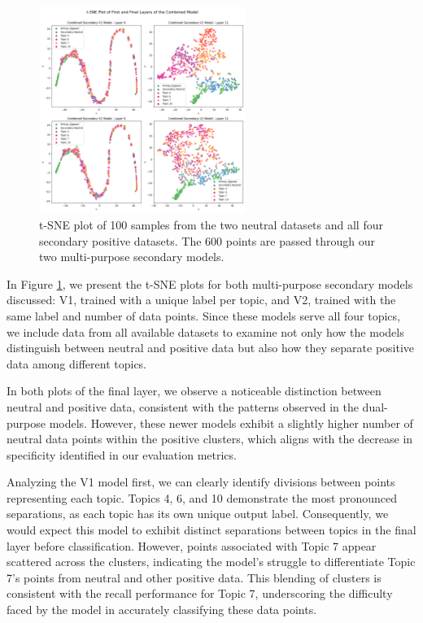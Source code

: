 \begin{figure}[ht]
    \centering
    \includegraphics[width=0.6\textwidth]{graphs/tsne/combined.png}
    \caption{t-SNE plot of 100 samples from the two neutral datasets and all four secondary positive datasets. The 600 points are passed through our two multi-purpose secondary models.}
    \label{fig:t_sne_plot_comb}
\end{figure}

In Figure \ref{fig:t_sne_plot_comb}, we present the t-SNE plots for both multi-purpose secondary models discussed: V1, trained with a unique label per topic, and V2, trained with the same label and number of data points. Since these models serve all four topics, we include data from all available datasets to examine not only how the models distinguish between neutral and positive data but also how they separate positive data among different topics.

In both plots of the final layer, we observe a noticeable distinction between neutral and positive data, consistent with the patterns observed in the dual-purpose models. However, these newer models exhibit a slightly higher number of neutral data points within the positive clusters, which aligns with the decrease in specificity identified in our evaluation metrics.

Analyzing the V1 model first, we can clearly identify divisions between points representing each topic. Topics 4, 6, and 10 demonstrate the most pronounced separations, as each topic has its own unique output label. Consequently, we would expect this model to exhibit distinct separations between topics in the final layer before classification. However, points associated with Topic 7 appear scattered across the clusters, indicating the model's struggle to differentiate Topic 7's points from neutral and other positive data. This blending of clusters is consistent with the recall performance for Topic 7, underscoring the difficulty faced by the model in accurately classifying these data points.

